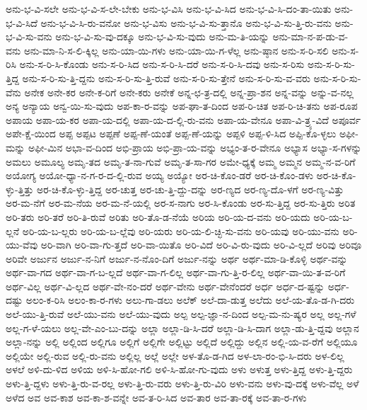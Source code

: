 {ಅನು-ಭ-ವಿ-ಸಲೇ
ಅನು-ಭ-ವಿ-ಸ-ಲೇ-ಬೇಕು
ಅನು-ಭ-ವಿಸಿ
ಅನು-ಭ-ವಿ-ಸಿದ
ಅನು-ಭ-ವಿ-ಸಿ-ದಂ-ತಾ-ಯಿತು
ಅನು-ಭ-ವಿ-ಸಿದೆ
ಅನು-ಭ-ವಿ-ಸಿ-ರು-ವನೋ
ಅನು-ಭ-ವಿಸು
ಅನು-ಭ-ವಿ-ಸು-ತ್ತಾನೊ
ಅನು-ಭ-ವಿ-ಸು-ತ್ತಿ-ರು-ವನು
ಅನು-ಭ-ವಿ-ಸು-ವನು
ಅನು-ಭ-ವಿ-ಸು-ವು-ದಕ್ಕೂ
ಅನು-ಭ-ವಿ-ಸು-ವುದು
ಅನು-ಮ-ತಿ-ಯನ್ನು
ಅನು-ಮಾ-ನ-ಪ-ಡು-ವ-ವನು
ಅನು-ಮಾ-ನಿ-ಸ-ಲಿ-ಕ್ಕಿಲ್ಲ
ಅನು-ಯಾ-ಯಿ-ಗಳು
ಅನು-ಯಾ-ಯಿ-ಗ-ಳೆಲ್ಲ
ಅನು-ಷ್ಠಾನ
ಅನು-ಸ-ರಿ-ಸಲಿ
ಅನು-ಸ-ರಿಸಿ
ಅನು-ಸ-ರಿ-ಸಿ-ಕೊಂಡು
ಅನು-ಸ-ರಿ-ಸಿದ
ಅನು-ಸ-ರಿ-ಸಿ-ದರೆ
ಅನು-ಸ-ರಿ-ಸಿ-ದವು
ಅನು-ಸ-ರಿಸು
ಅನು-ಸ-ರಿ-ಸು-ತ್ತಿದ್ದ
ಅನು-ಸ-ರಿ-ಸು-ತ್ತಿ-ದ್ದನು
ಅನು-ಸ-ರಿ-ಸು-ತ್ತಿ-ರುವೆ
ಅನು-ಸ-ರಿ-ಸು-ತ್ತೇನೆ
ಅನು-ಸ-ರಿ-ಸು-ವ-ವರು
ಅನು-ಸ-ರಿ-ಸು-ವೆನು
ಅನೇಕ
ಅನೇ-ಕರ
ಅನೇ-ಕ-ರಿಗೆ
ಅನೇ-ಕರು
ಅನೇಕೆ
ಅನ್ನ-ಛ-ತ್ರ-ದಲ್ಲಿ
ಅನ್ನ-ಪ್ರಾ-ಶನ
ಅನ್ನ-ವನ್ನು
ಅನ್ನು-ವ-ನಲ್ಲ
ಅನ್ಯ
ಅನ್ಯಾಯ
ಅನ್ವ-ಯಿ-ಸು-ವುದು
ಅಪ-ಕಾ-ರ-ವನ್ನು
ಅಪ-ಘಾ-ತ-ದಿಂದ
ಅಪ-ರಿ-ಚಿತ
ಅಪ-ರಿ-ಚಿ-ತನು
ಅಪ-ರೂಪ
ಅಪಾಯ
ಅಪಾ-ಯ-ಕರ
ಅಪಾ-ಯ-ದಲ್ಲಿ
ಅಪಾ-ಯ-ದ-ಲ್ಲಿ-ರು-ವನು
ಅಪಾ-ಯ-ವೇನೂ
ಅಪಾ-ವಿ-ತ್ರ್ಯ-ವಿದೆ
ಅಪೂರ್ವ
ಅಪೇ-ಕ್ಷೆ-ಯಿಂದ
ಅಪ್ಪ
ಅಪ್ಪಟ
ಅಪ್ಪಣೆ
ಅಪ್ಪ-ಣೆ-ಯಂತೆ
ಅಪ್ಪ-ಣೆ-ಯನ್ನು
ಅಪ್ಪಳಿ
ಅಪ್ಪ-ಳಿ-ಸಿದ
ಅಪ್ಪಿ-ಕೊ-ಳ್ಳಲು
ಅಫೀ-ಮನ್ನು
ಅಫೀ-ಮಿನ
ಅಭಾ-ವ-ದಿಂದ
ಅಭಿ-ಪ್ರಾಯ
ಅಭಿ-ಪ್ರಾ-ಯ-ವನ್ನು
ಅಭ್ಯಂ-ತ-ರ-ವೇನೂ
ಅಭ್ಯಾಸ
ಅಭ್ಯಾ-ಸ-ಗಳನ್ನು
ಅಮಲು
ಅಮೂಲ್ಯ
ಅಮೃ-ತದ
ಅಮೃ-ತ-ನಾ-ಗುವೆ
ಅಮೃ-ತ-ಸಾ-ಗರ
ಅಮೇ-ಧ್ಯಕ್ಕೆ
ಅಮ್ಮ
ಅಮ್ಮನ
ಅಮ್ಮ-ನ-ವ-ರಿಗೆ
ಅಯೋಗ್ಯ
ಅಯೋ-ಧ್ಯಾ-ನ-ಗ-ರ-ದ-ಲ್ಲಿ-ರುವ
ಅಯ್ಯ
ಅಯ್ಯೋ
ಅರ-ಚಿ-ಕೊಂ-ಡರೆ
ಅರ-ಚಿ-ಕೊಂ-ಡಳು
ಅರ-ಚಿ-ಕೊ-ಳ್ಳು-ತ್ತಿತ್ತು
ಅರ-ಚಿ-ಕೊ-ಳ್ಳು-ತ್ತಿದ್ದ
ಅರ-ಚುತ್ತ
ಅರ-ಚು-ತ್ತಿ-ದ್ದು-ದನ್ನು
ಅರ-ಣ್ಯದ
ಅರ-ಣ್ಯ-ದೊ-ಳಗೆ
ಅರ-ಣ್ಯ-ವಿತ್ತು
ಅರ-ಮ-ನೆಗೆ
ಅರ-ಮ-ನೆಯ
ಅರ-ಮ-ನೆ-ಯಲ್ಲಿ
ಅರ-ಸ-ನಾಗು
ಅರ-ಸಿ-ಕೊಂಡು
ಅರ-ಸು-ತ್ತಿದ್ದ
ಅರ-ಸು-ತ್ತಿರು
ಅರಿತ
ಅರಿ-ತರು
ಅರಿ-ತರೆ
ಅರಿ-ತಿ-ರುವೆ
ಅರಿತು
ಅರಿ-ತೊ-ಡ-ನೆಯೆ
ಅರಿಯ
ಅರಿ-ಯ-ದ-ವನು
ಅರಿ-ಯದು
ಅರಿ-ಯ-ಬ-ಲ್ಲನೆ
ಅರಿ-ಯ-ಬ-ಲ್ಲರು
ಅರಿ-ಯ-ಬ-ಲ್ಲೆವು
ಅರಿ-ಯರು
ಅರಿ-ಯ-ಲಿ-ಚ್ಛಿ-ಸು-ವನು
ಅರಿ-ಯವು
ಅರಿ-ಯು-ವನು
ಅರಿ-ಯು-ವೆವು
ಅರಿ-ವಾಗಿ
ಅರಿ-ವಾ-ಗು-ತ್ತದೆ
ಅರಿ-ವಾ-ಯಿತೊ
ಅರಿ-ವಿದೆ
ಅರಿ-ವಿ-ರು-ವುದು
ಅರಿ-ವಿ-ಲ್ಲದೆ
ಅರಿವು
ಅರಿವೂ
ಅರಿವೇ
ಅರ್ಜುನ
ಅರ್ಜು-ನ-ನಿಗೆ
ಅರ್ಜು-ನ-ನೊಂ-ದಿಗೆ
ಅರ್ಜು-ನನ್ನು
ಅರ್ಥ
ಅರ್ಥ-ಮಾ-ಡಿ-ಕೊಳ್ಳಿ
ಅರ್ಥ-ವನ್ನು
ಅರ್ಥ-ವಾ-ಗದ
ಅರ್ಥ-ವಾ-ಗ-ಬ-ಲ್ಲದೆ
ಅರ್ಥ-ವಾ-ಗ-ಲಿಲ್ಲ
ಅರ್ಥ-ವಾ-ಗು-ತ್ತಿ-ರ-ಲಿಲ್ಲ
ಅರ್ಥ-ವಾ-ಯಿ-ತ-ವ-ರಿಗೆ
ಅರ್ಥ-ವಿಲ್ಲ
ಅರ್ಥ-ವಿ-ಲ್ಲದ
ಅರ್ಥ-ವೇ-ನಂ-ದರೆ
ಅರ್ಥ-ವೇನು
ಅರ್ಥ-ವೇನೆಂದರೆ
ಅರ್ಧ
ಅರ್ಧ-ದ-ಷ್ಟನ್ನು
ಅರ್ಧ-ದಷ್ಟು
ಅಲಂ-ಕ-ರಿಸಿ
ಅಲಂ-ಕಾ-ರ-ಗಳು
ಅಲು-ಗಾ-ಡಲು
ಅಲೆಕ್
ಅಲೆ-ದಾ-ಡುತ್ತ
ಅಲೆದು
ಅಲೆ-ಯ-ತೊ-ಡ-ಗಿ-ದರು
ಅಲೆ-ಯು-ತ್ತಿ-ರುವೆ
ಅಲೆ-ಯು-ವನು
ಅಲೆ-ಯು-ವುದು
ಅಲ್ಪ
ಅಲ್ಪ-ಜ್ಞಾ-ನ-ದಿಂದ
ಅಲ್ಪ-ಮ-ನು-ಷ್ಯರ
ಅಲ್ಲ
ಅಲ್ಲ-ಗಳೆ
ಅಲ್ಲ-ಗ-ಳೆ-ಯಲು
ಅಲ್ಲ-ವೇ-ಎಂ-ಬು-ದನ್ನು
ಅಲ್ಲಾ
ಅಲ್ಲಾ-ಡಿ-ಸಿ-ದರೆ
ಅಲ್ಲಾ-ಡಿ-ಸಿ-ದಾಗ
ಅಲ್ಲಾ-ಡು-ತ್ತಿ-ದ್ದವು
ಅಲ್ಲಾನ
ಅಲ್ಲಾ-ನನ್ನು
ಅಲ್ಲಿ
ಅಲ್ಲಿಂದ
ಅಲ್ಲಿಗೂ
ಅಲ್ಲಿಗೆ
ಅಲ್ಲಿಗೇ
ಅಲ್ಲಿಟ್ಟು
ಅಲ್ಲಿದೆ
ಅಲ್ಲಿದ್ದು
ಅಲ್ಲಿನ
ಅಲ್ಲಿ-ಯ-ವ-ರೆಗೆ
ಅಲ್ಲಿಯೂ
ಅಲ್ಲಿಯೇ
ಅಲ್ಲಿ-ರುವ
ಅಲ್ಲಿ-ರು-ವನು
ಅಲ್ಲಿಲ್ಲ
ಅಲ್ಲೆ
ಅಲ್ಲೇ
ಅಳ-ತೊ-ಡ-ಗಿದ
ಅಳ-ಲಾ-ರಂ-ಭಿ-ಸಿ-ದರು
ಅಳ-ಲಿಲ್ಲ
ಅಳಲೆ
ಅಳಿ-ದು-ಳಿದ
ಅಳಿಯ
ಅಳಿ-ಸಿ-ಹೋ-ಗಲಿ
ಅಳಿ-ಸಿ-ಹೋ-ಗು-ವುದು
ಅಳು
ಅಳುತ್ತ
ಅಳು-ತ್ತಿದ್ದ
ಅಳು-ತ್ತಿ-ದ್ದರು
ಅಳು-ತ್ತಿ-ದ್ದಳು
ಅಳು-ತ್ತಿ-ರು-ವ-ರಲ್ಲ
ಅಳು-ತ್ತಿ-ರು-ವರು
ಅಳು-ತ್ತಿ-ರು-ವಿರಿ
ಅಳು-ವನು
ಅಳು-ವು-ದಕ್ಕೆ
ಅಳು-ವೆಲ್ಲ
ಅಳೆ
ಅಳೆದ
ಅವ
ಅವ-ಕಾಶ
ಅವ-ಕಾ-ಶ-ವನ್ನೇ
ಅವ-ತ-ರಿ-ಸಿದ
ಅವ-ತಾರ
ಅವ-ತಾ-ರಕ್ಕೆ
ಅವ-ತಾ-ರ-ಗಳು
}
